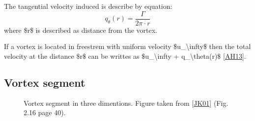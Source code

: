 \documentclass[letterpaper,10pt,english]{jupyterBook}
\begin{document}
\sphinxAtStartPar
The tangential velocity induced is describe by equation:
\label{equation:chapters/theory:819b5d19-2c73-42a3-9cfd-33e222846ab5}\begin{equation}
\label{q_theta}
q_\theta(r) = \frac{\Gamma}{2\pi \cdot r}
\end{equation}
\sphinxAtStartPar
where \$r\$ is described as distance from the vortex.

\sphinxAtStartPar
If a vortex is located in free\sphinxhyphen{}strem with uniform velocity \$u\_\textbackslash{}infty\$ then the total velocity at the distance \$r\$ can be writtes as \$u\_\textbackslash{}infty + q\_\textbackslash{}theta(r)\$ {[}\hyperlink{cite.chapters/bibliography:id2}{AH13}{]}.


\subsection{Vortex segment}
\label{\detokenize{chapters/theory:vortex-segment}}
\begin{figure}[htbp]
\centering
\capstart

\noindent{}
\caption{Vortex segment in three dimentions. Figure taken from {[}\hyperlink{cite.chapters/bibliography:id3}{JK01}{]} (Fig. 2.16 page 40).}\label{\detokenize{chapters/theory:id9}}\end{figure}
\end{document}
